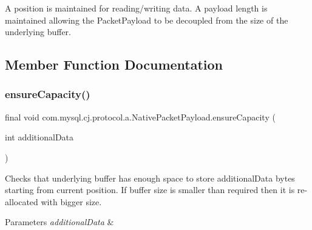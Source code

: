 A position is maintained for reading/writing data. A payload length is maintained allowing the Packet\+Payload to be decoupled from the size of the underlying buffer. 

\subsection{Member Function Documentation}
\mbox{\label{classcom_1_1mysql_1_1cj_1_1protocol_1_1a_1_1_native_packet_payload_a5ac2d3e7b29e3d19ba69dd7cc2942856}} 
\subsubsection{\texorpdfstring{ensure\+Capacity()}{ensureCapacity()}}
{\footnotesize\ttfamily final void com.\+mysql.\+cj.\+protocol.\+a.\+Native\+Packet\+Payload.\+ensure\+Capacity (\begin{DoxyParamCaption}\item[{int}]{additional\+Data }\end{DoxyParamCaption})}

Checks that underlying buffer has enough space to store additional\+Data bytes starting from current position. If buffer size is smaller than required then it is re-\/allocated with bigger size.


\begin{DoxyParams}{Parameters}
{\em additional\+Data} & \\
\hline
\end{DoxyParams}
\mbox{\label{classcom_1_1mysql_1_1cj_1_1protocol_1_1a_1_1_native_packet_payload_a9aad2cb05c0a41d027987a601991e1a0}} 
